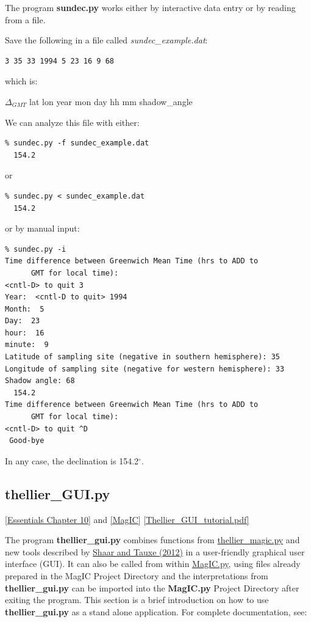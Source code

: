 \documentclass[11pt]{book}
\begin{document}
{{The program {\bf sundec.py}  works either by interactive data entry or by reading from a file.

Save the following in a file called {\it sundec\_example.dat}:

\begin{verbatim}
3 35 33 1994 5 23 16 9 68
\end{verbatim}
which is:

$\Delta_{GMT}$ lat lon year mon day hh mm shadow\_angle

We can analyze this file with either: 

\begin{verbatim}
% sundec.py -f sundec_example.dat
  154.2
\end{verbatim} 
or
\begin{verbatim}
% sundec.py < sundec_example.dat
  154.2
\end{verbatim} 
or by manual input:
\begin{verbatim}
% sundec.py -i
Time difference between Greenwich Mean Time (hrs to ADD to
      GMT for local time): 
<cntl-D> to quit 3
Year:  <cntl-D to quit> 1994
Month:  5
Day:  23
hour:  16
minute:  9
Latitude of sampling site (negative in southern hemisphere): 35
Longitude of sampling site (negative for western hemisphere): 33
Shadow angle: 68
  154.2
Time difference between Greenwich Mean Time (hrs to ADD to
      GMT for local time): 
<cntl-D> to quit ^D
 Good-bye

\end{verbatim} 

In any case, the declination is 154.2$^{\circ}$.

%
\subsection{thellier\_GUI.py}
\href{http://magician.ucsd.edu/Essentials_2/WebBook2ch10.html#ch10}{[Essentials Chapter 10]} and \href{#MagIC}{[MagIC}]
\href{http://earthref.org/PmagPy/pmagpydocs/Thellier_GUI_tutorial.pdf}{[Thellier\_GUI\_tutorial.pdf]}

The program {\bf thellier\_gui.py}  combines functions from \href{#thellier_magic.py}{thellier\_magic.py} and new tools described by  \href{http://magician.ucsd.edu/~ltauxe/CV/open/shaar12.pdf}{Shaar and Tauxe (2012)} in a user-friendly graphical user interface (GUI).  It can also be called from within \href{#MagIC.py}{MagIC.py}, using files already prepared in the MagIC Project Directory and the interpretations from {\bf thellier\_gui.py} can be imported into the {\bf MagIC.py} Project Directory after exiting the program.   This section is a brief introduction on how to use {\bf thellier\_gui.py} as a stand alone application.  For complete documentation, see:

}}
\end{document}
